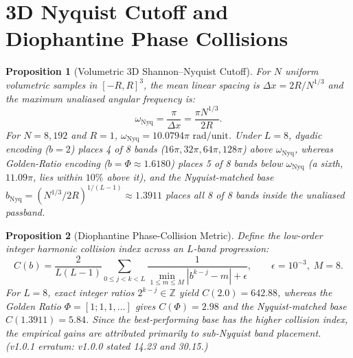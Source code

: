 \documentclass[11pt,a4paper]{article}
\newtheorem{proposition}{Proposition}
\begin{document}
\section{3D Nyquist Cutoff and Diophantine Phase Collisions}
\begin{proposition}[Volumetric 3D Shannon--Nyquist Cutoff]
For $N$ uniform volumetric samples in $[-R, R]^3$, the mean linear spacing is $\Delta x = 2R / N^{1/3}$ and the maximum unaliased angular frequency is:
\begin{equation}
\omega_{\mathrm{Nyq}} = \frac{\pi}{\Delta x} = \frac{\pi N^{1/3}}{2R}.
\end{equation}
For $N = 8,192$ and $R = 1$, $\omega_{\mathrm{Nyq}} = 10.0794\pi\text{ rad/unit}$. Under $L = 8$, dyadic encoding ($b=2$) places 4 of 8 bands ($16\pi, 32\pi, 64\pi, 128\pi$) above $\omega_{\mathrm{Nyq}}$, whereas Golden-Ratio encoding ($b=\Phi \approx 1.6180$) places 5 of 8 bands below $\omega_{\mathrm{Nyq}}$ (a sixth, $11.09\pi$, lies within $10\%$ above it), and the Nyquist-matched base $b_{\mathrm{Nyq}} = (N^{1/3}/2R)^{1/(L-1)} \approx 1.3911$ places all 8 of 8 bands inside the unaliased passband.
\end{proposition}

\begin{proposition}[Diophantine Phase-Collision Metric]
Define the low-order integer harmonic collision index across an $L$-band progression:
\begin{equation}
C(b) = \frac{2}{L(L-1)} \sum_{0 \le j < k < L} \frac{1}{\min_{1 \le m \le M} |b^{k-j} - m| + \epsilon}, \qquad \epsilon = 10^{-3},\; M = 8.
\end{equation}
For $L = 8$, exact integer ratios $2^{k-j} \in \mathbb{Z}$ yield $C(2.0) = 642.88$, whereas the Golden Ratio $\Phi = [1; 1, 1, \dots]$ gives $C(\Phi) = 2.98$ and the Nyquist-matched base $C(1.3911) = 5.84$. Since the best-performing base has the higher collision index, the empirical gains are attributed primarily to sub-Nyquist band placement. (v1.0.1 erratum: v1.0.0 stated 14.23 and 30.15.)
\end{proposition}
\end{document}
